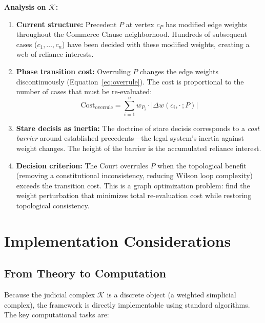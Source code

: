 \documentclass[12pt]{article}
\theoremstyle{definition}
\theoremstyle{remark}
\begin{document}
\textbf{Analysis on $\mathcal{K}$:}
\begin{enumerate}
    \item \textbf{Current structure:} Precedent $P$ at vertex $c_P$ has modified edge weights throughout the Commerce Clause neighborhood.  Hundreds of subsequent cases ($c_1, \ldots, c_n$) have been decided with these modified weights, creating a web of reliance interests.
    \item \textbf{Phase transition cost:} Overruling $P$ changes the edge weights discontinuously (Equation~\ref{eq:overrule}).  The cost is proportional to the number of cases that must be re-evaluated:
    \begin{equation}
    \text{Cost}_{\text{overrule}} = \sum_{i=1}^n w_{P_i} \cdot |\Delta w(c_i, \cdot\,; P)|
    \label{eq:overrule_cost}
    \end{equation}
    \item \textbf{Stare decisis as inertia:} The doctrine of stare decisis corresponds to a \emph{cost barrier} around established precedents---the legal system's inertia against weight changes.  The height of the barrier is the accumulated reliance interest.
    \item \textbf{Decision criterion:} The Court overrules $P$ when the topological benefit (removing a constitutional inconsistency, reducing Wilson loop complexity) exceeds the transition cost.  This is a graph optimization problem: find the weight perturbation that minimizes total re-evaluation cost while restoring topological consistency.
\end{enumerate}


\section{Implementation Considerations}
\label{sec:implementation}

\subsection{From Theory to Computation}

Because the judicial complex $\mathcal{K}$ is a discrete object (a weighted simplicial complex), the framework is directly implementable using standard algorithms.  The key computational tasks are:
\end{document}

